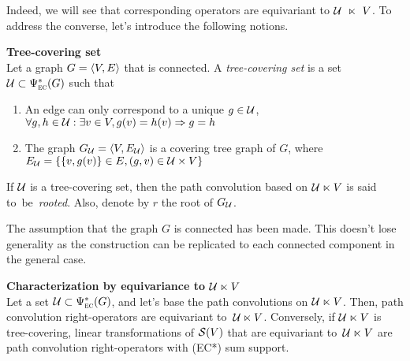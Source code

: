 Indeed, we will see that corresponding operators are equivariant to $\mathcal{U}~\ltimes~V$. To address the converse, let's introduce the following notions.

\begin{definition}\textbf{Tree-covering set}\\
Let a graph $G = \langle V, E \rangle$ that is connected. A \emph{tree-covering set} is a set $\mathcal{U} \subset \Psi_{\operatorname{\textsc{ec}}}^*(G)$ such that
\begin{enumerate}
  \item An edge can only correspond to a unique $g\in \mathcal{U}$,\\
    \ie $\forall g,h \in \mathcal{U} : \exists v \in V, g(v) = h(v) \Rightarrow g=h$
  \item The graph $G_{\mathcal{U}} = \langle V, E_{\mathcal{U}} \rangle$ is a covering tree graph of $G$, where\\
    $E_{\mathcal{U}} = \{\{v, g(v)\} \in E, (g, v) \in \mathcal{U} \times V\}$
\end{enumerate}
If $\mathcal{U}$ is a tree-covering set, then the path convolution based on  $\mathcal{U} \ltimes V$ is said to~be~\emph{rooted}.
Also, denote by $r$ the root of $G_{\mathcal{U}}$.
\end{definition}

\begin{remark}The assumption that the graph $G$ is connected has been made. This doesn't lose generality as the construction can be replicated to each connected component in the general case.
\end{remark}

\begin{proposition}\textbf{Characterization by equivariance to $\mathcal{U} \ltimes V$}\\
Let a set $\mathcal{U} \subset \Psi_{\operatorname{\textsc{ec}}}^*(G)$, and let's base the path convolutions on $\mathcal{U} \ltimes V$. Then, path convolution right-operators are equivariant to~$\mathcal{U} \ltimes V$.
Conversely, if $\mathcal{U} \ltimes V$ is tree-covering, linear transformations of $\mathcal{S}(V)$ that are equivariant to~$\mathcal{U} \ltimes V$ are path convolution right-operators with (EC*) sum support.
\end{proposition}

